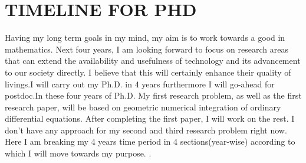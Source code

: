\documentclass[PhD]{iitmdiss} %
\begin{document}
\appendix
\chapter{TIMELINE FOR PHD}

Having my long term goals in my mind, my aim is to work towards a good in mathematics. Next four years, I am looking forward to focus on research areas that can extend the availability and usefulness of technology and its advancement to our society directly. I believe that this will certainly enhance their quality of livings.I will carry out my Ph.D. in 4 years furthermore I will go-ahead for postdoc.In these four years of Ph.D. My first research problem, as well as the first research paper, will be based on geometric numerical integration of ordinary differential equations. After completing the first paper, I will work on the rest. I don't have any approach for my second and third research problem right now. Here I am breaking my 4 years time period in 4 sections(year-wise) according to which I will move towards my purpose.
.
\end{document}
